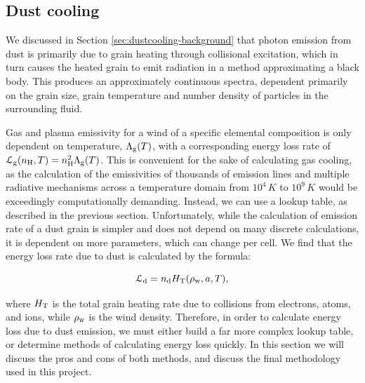 \subsection{Dust cooling}
\label{sec:dustcoolingmodel}


We discussed in Section \ref{sec:dustcooling-background} that photon emission from dust is primarily due to grain heating through collisional excitation, which in turn causes the heated grain to emit radiation in a method approximating a black body.
This produces an approximately continuous spectra, dependent primarily on the grain size, grain temperature and number density of particles in the surrounding fluid.

Gas and plasma emissivity for a wind of a specific elemental composition is only dependent on temperature, $\Lambda_\text{g}(T)$, with a corresponding energy loss rate of $\mathcal{L}_\text{g} (n_\text{H},T) = n_\text{H}^2 \Lambda_\text{g}(T)$. 
This is convenient for the sake of calculating gas cooling, as the calculation of the emissivities of thousands of emission lines and multiple radiative mechanisms across a temperature domain from $10^4\, \si{K}$ to $10^9\,\si{K}$ would be exceedingly computationally demanding.
Instead, we can use a lookup table, as described in the previous section.
Unfortunately, while the calculation of emission rate of a dust grain is simpler and does not depend on many discrete calculations, it is dependent on more parameters, which can change per cell.
We find that the energy loss rate due to dust is calculated by the formula:

\begin{equation}
  \label{eq:dustenergylosstotal}
  \mathcal{L}_\text{d} = n_\text{d} H_\text{T} (\rho_\text{w},a,T) ,
\end{equation}

\noindent
where $H_\text{T}$ is the total grain heating rate due to collisions from electrons, atoms, and ions, while $\rho_\text{w}$ is the wind density. 
Therefore, in order to calculate energy loss due to dust emission, we must either build a far more complex lookup table, or determine methods of calculating energy loss quickly.
In this section we will discuss the pros and cons of both methods, and discuss the final methodology used in this project.

